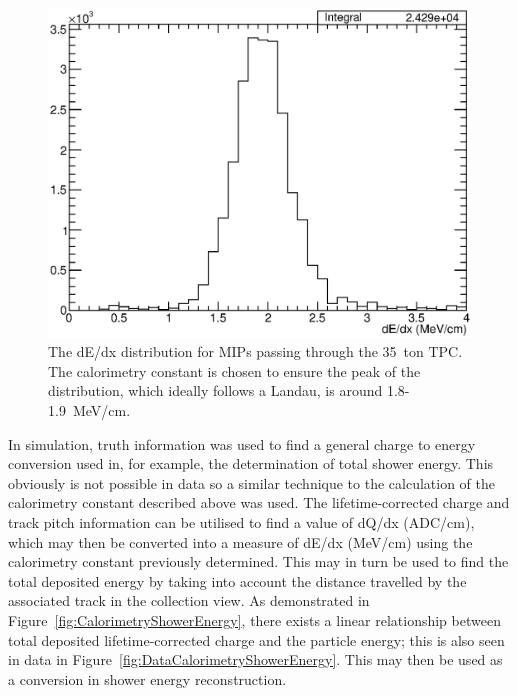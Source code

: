 \begin{figure}
  \centering
  \includegraphics[width=12cm]{dEdx.eps}
  \caption[The dE/dx distribution for MIPs passing through the 35~ton TPC.]{The dE/dx distribution for MIPs passing through the 35~ton TPC.  The calorimetry constant is chosen to ensure the peak of the distribution, which ideally follows a Landau, is around 1.8-1.9~MeV/cm.}
  \label{fig:DataCalorimetrydEdx}
\end{figure}

In simulation, truth information was used to find a general charge to energy conversion used in, for example, the determination of total shower energy.  This obviously is not possible in data so a similar technique to the calculation of the calorimetry constant described above was used.  The lifetime-corrected charge and track pitch information can be utilised to find a value of dQ/dx (ADC/cm), which may then be converted into a measure of dE/dx (MeV/cm) using the calorimetry constant previously determined.  This may in turn be used to find the total deposited energy by taking into account the distance travelled by the associated track in the collection view.   As demonstrated in Figure~\ref{fig:CalorimetryShowerEnergy}, there exists a linear relationship between total deposited lifetime-corrected charge and the particle energy; this is also seen in data in Figure~\ref{fig:DataCalorimetryShowerEnergy}.  This may then be used as a conversion in shower energy reconstruction.

